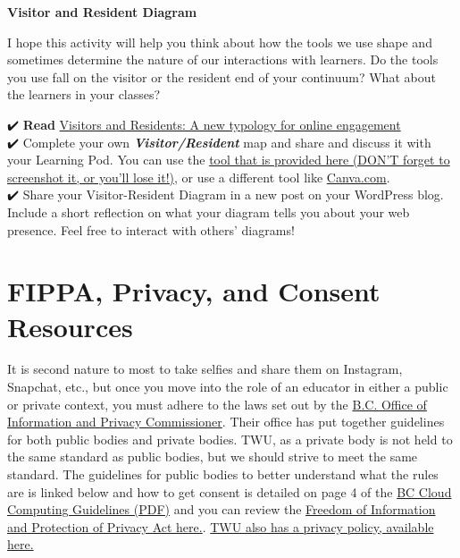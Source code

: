 \documentclass[
]{book}
\begin{document}
\begin{wp}
\textbf{Visitor and Resident Diagram}

I hope this activity will help you think about how the tools we use
shape and sometimes determine the nature of our interactions with
learners. Do the tools you use fall on the visitor or the resident end
of your continuum? What about the learners in your classes?

✔️ \textbf{Read}
\href{https://firstmonday.org/ojs/index.php/fm/article/view/3171}{Visitors
and Residents: A new typology for online engagement}\\
✔️ Complete your own \textbf{\emph{Visitor/Resident}} map and share and
discuss it with your Learning Pod. You can use the
\href{https://experimental.worldcat.org/vandrmapping/editMap}{tool that
is provided here (DON'T forget to screenshot it, or you'll lose it!)},
or use a different tool like \href{https://canva.com}{Canva.com}.\\
✔️ Share your Visitor-Resident Diagram in a new post on your WordPress
blog. Include a short reflection on what your diagram tells you about
your web presence. Feel free to interact with others' diagrams!
\end{wp}

\hypertarget{fippa-privacy-and-consent-resources}{%
\section{FIPPA, Privacy, and Consent Resources}\label{fippa-privacy-and-consent-resources}}

It is second nature to most to take selfies and share them on Instagram, Snapchat, etc., but once you move into the role of an educator in either a public or private context, you must adhere to the laws set out by the \href{https://www.oipc.bc.ca/}{B.C. Office of Information and Privacy Commissioner}. Their office has put together guidelines for both public bodies and private bodies. TWU, as a private body is not held to the same standard as public bodies, but we should strive to meet the same standard. The guidelines for public bodies to better understand what the rules are is linked below and how to get consent is detailed on page 4 of the \href{https://esquimalt.public.sd61.bc.ca/wp-content/uploads/sites/34/2013/09/OIPC-Cloud-Computing-Guidelines-for-Public-Bodies.pdf}{BC Cloud Computing Guidelines (PDF)} and you can review the \href{http://www.bclaws.ca/Recon/document/ID/freeside/96165_00}{Freedom of Information and Protection of Privacy Act here.}. \href{https://www.twu.ca/about/university-privacy-policy}{TWU also has a privacy policy, available here.}
\end{document}
